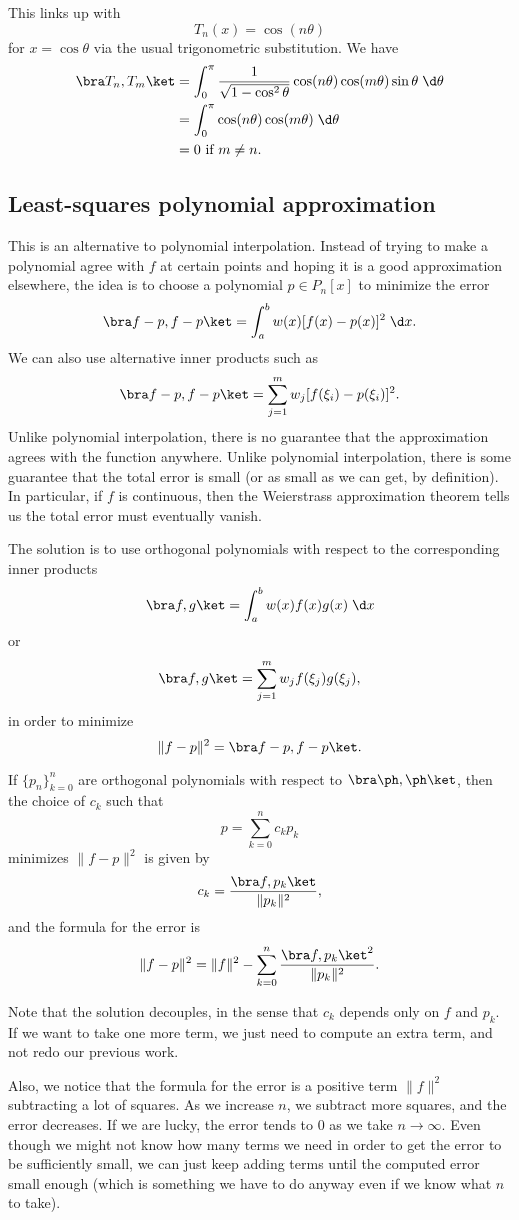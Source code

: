 \documentclass[a4paper]{article}
\begin{document}
This links up with
\[
  T_n (x) = \cos(n\theta)
\]
for $x = \cos \theta$ via the usual trigonometric substitution. We have
\begin{align*}
  \bra T_n, T_m \ket &= \int_0^\pi \frac{1}{\sqrt{1 - \cos^2 \theta}} \cos(n\theta) \cos (m\theta) \sin \theta \;\d \theta\\
  &= \int_0^\pi \cos(n\theta) \cos (m\theta)\;\d \theta\\
  &= 0\text{ if }m\not= n.
\end{align*}
\subsection{Least-squares polynomial approximation}
This is an alternative to polynomial interpolation. Instead of trying to make a polynomial agree with $f$ at certain points and hoping it is a good approximation elsewhere, the idea is to choose a polynomial $p \in P_n[x]$ to minimize the error
\[
  \bra f - p, f - p\ket = \int_a^b w(x) [f(x) - p(x)]^2 \;\d x.
\]
We can also use alternative inner products such as
\[
  \bra f - p, f - p\ket = \sum_{j = 1}^m w_j [f(\xi_i) - p(\xi_i)]^2.
\]
Unlike polynomial interpolation, there is no guarantee that the approximation agrees with the function anywhere. Unlike polynomial interpolation, there is some guarantee that the total error is small (or as small as we can get, by definition). In particular, if $f$ is continuous, then the Weierstrass approximation theorem tells us the total error must eventually vanish.

The solution is to use orthogonal polynomials with respect to the corresponding inner products
\[
  \bra f, g\ket = \int_a^b w(x) f(x) g(x)\;\d x
\]
or
\[
  \bra f, g\ket = \sum_{j = 1}^m w_j f(\xi_j) g(\xi_j),
\]
in order to minimize
\[
  \|f - p\|^2 = \bra f - p, f - p\ket.
\]
\begin{thm}
  If $\{p_n\}_{k = 0}^n$ are orthogonal polynomials with respect to $\bra \ph, \ph \ket$, then the choice of $c_k$ such that
  \[
    p = \sum_{k = 0}^n c_k p_k
  \]
  minimizes $\|f - p\|^2$ is given by
  \[
    c_k = \frac{\bra f, p_k\ket}{\|p_k\|^2},
  \]
  and the formula for the error is
  \[
    \|f - p\|^2 = \|f\|^2 - \sum_{k = 0}^n \frac{\bra f, p_k\ket^2}{\|p_k\|^2}.
  \]
\end{thm}
Note that the solution decouples, in the sense that $c_k$ depends only on $f$ and $p_k$. If we want to take one more term, we just need to compute an extra term, and not redo our previous work.

Also, we notice that the formula for the error is a positive term $\|f\|^2$ subtracting a lot of squares. As we increase $n$, we subtract more squares, and the error decreases. If we are lucky, the error tends to $0$ as we take $n \to \infty$. Even though we might not know how many terms we need in order to get the error to be sufficiently small, we can just keep adding terms until the computed error small enough (which is something we have to do anyway even if we know what $n$ to take).
\end{document}
